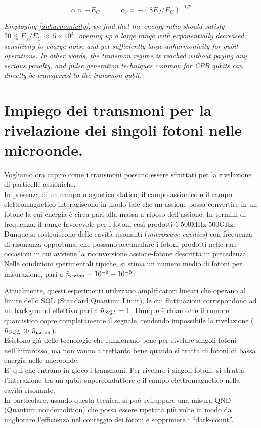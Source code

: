 \documentclass[10pt,a4paper]{article}
\begin{document}
\begin{equation}
    \alpha \approx -E_C \qquad \quad \alpha_r \approx -(8E_J/E_C)^{-1/2}
    \label{anharmonicity}
\end{equation}


\textit{Employing \eqref{anharmonicity}, we find that the energy ratio should
satisfy $20 \lesssim  E_J/E_C \ll 5 \times 10^4$, opening up a large range with exponentially decreased sensitivity to charge noise and yet sufficiently large anharmonicity for qubit operations. In other words, the transmon regime is reached without paying any serious penalty, and pulse generation techniques common for CPB qubits can directly be transferred to the transmon qubit.}

\section{Impiego dei transmoni per la rivelazione dei singoli fotoni nelle microonde.}


Vogliamo ora capire come i transmoni possano essere sfruttati per la rivelazione di particelle assioniche.\\
In presenza di un campo magnetico statico, il campo assionico e il campo elettromagnetico interagiscono in modo tale che un assione possa convertire in un fotone la cui energia è circa pari alla massa a riposo dell’assione. In termini di frequenza, il range favorevole per i fotoni così prodotti è 500MHz-500GHz.\\

 Dunque si costruiscono delle cavità risonanti (\textit{microwave cavities}) con frequenza di risonanza opportuna, che possano accumulare i fotoni prodotti nelle rare occasioni in cui avviene la riconversione assione-fotone descritta in precedenza. Nelle condizioni sperimentali tipiche, si stima un numero medio di fotoni per misurazione, pari a $\Bar{n}_{axion}\sim 10^{-8}-10^{-5}$.

Attualmente, questi esperimenti utilizzano amplificatori lineari che operano al limite dello SQL (Standard Quantum Limit), le cui fluttuazioni corrispondono ad un background effettivo pari a $\Bar{n}_{SQL}=1$. Dunque è chiaro che il rumore quantistico copre completamente il segnale, rendendo impossibile la rivelazione ($\Bar{n}_{SQL}\gg\Bar{n}_{axion} $).\\

Esistono già delle tecnologie che funzionano bene per rivelare singoli fotoni nell’infrarosso, ma non vanno altrettanto bene quando si tratta di fotoni di bassa energia nelle microonde.\\
E’ qui che entrano in gioco i transmoni. Per rivelare i singoli fotoni, si sfrutta l’interazione tra un qubit superconduttore e il campo elettromagnetico nella cavità risonante.\\
In particolare, usando questa tecnica, si può sviluppare una misura QND (Quantum nondemolition) che possa essere ripetuta più volte in modo da migliorare l’efficienza nel conteggio dei fotoni e sopprimere i “dark-count”.
\end{document}
